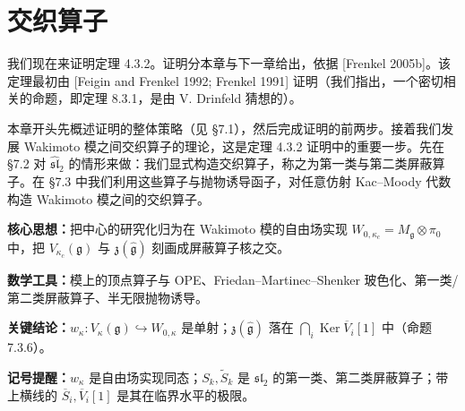 
\chapter{交织算子}

我们现在来证明定理 4.3.2。证明分本章与下一章给出，依据 [Frenkel 2005b]。该定理最初由 [Feigin and Frenkel 1992; Frenkel 1991] 证明（我们指出，一个密切相关的命题，即定理 8.3.1，是由 V. Drinfeld 猜想的）。

本章开头先概述证明的整体策略（见 §7.1），然后完成证明的前两步。接着我们发展 Wakimoto 模之间交织算子的理论，这是定理 4.3.2 证明中的重要一步。先在 §7.2 对 $\widehat{\mathfrak{sl}}_2$ 的情形来做：我们显式构造交织算子，称之为第一类与第二类屏蔽算子。在 §7.3 中我们利用这些算子与抛物诱导函子，对任意仿射 Kac--Moody 代数构造 Wakimoto 模之间的交织算子。


\begin{keypoints}
    \item \textbf{核心思想：}把中心的研究化归为在 Wakimoto 模的自由场实现 $W_{0,\kappa_c}=M_{\mathfrak{g}}\otimes\pi_0$ 中，把 $V_{\kappa_c}(\mathfrak{g})$ 与 $\mathfrak{z}(\hat{\mathfrak{g}})$ 刻画成屏蔽算子核之交。
    \item \textbf{数学工具：}模上的顶点算子与 OPE、Friedan--Martinec--Shenker 玻色化、第一类/第二类屏蔽算子、半无限抛物诱导。
    \item \textbf{关键结论：}$w_\kappa:V_\kappa(\mathfrak{g})\hookrightarrow W_{0,\kappa}$ 是单射；$\mathfrak{z}(\hat{\mathfrak{g}})$ 落在 $\bigcap_i\operatorname{Ker}\overline{V}_i[1]$ 中（命题 7.3.6）。
    \item \textbf{记号提醒：}$w_\kappa$ 是自由场实现同态；$S_k,\widetilde{S}_k$ 是 $\mathfrak{sl}_2$ 的第一类、第二类屏蔽算子；带上横线的 $\overline{S}_i,\overline{V}_i[1]$ 是其在临界水平的极限。
\end{keypoints}

